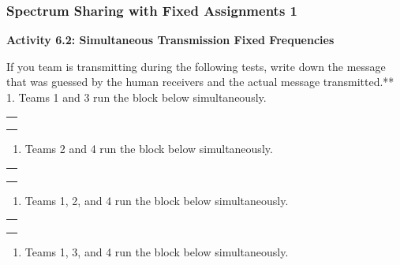 \documentclass[11pt]{article}
\providecommand{\tightlist}{%
      \setlength{\itemsep}{0pt}\setlength{\parskip}{0pt}}
\begin{document}
\hypertarget{spectrum-sharing-with-fixed-assignments-1}{%
\subsubsection*{Spectrum Sharing with Fixed Assignments
1}\label{spectrum-sharing-with-fixed-assignments-1}}

\textbf{Activity 6.2: Simultaneous Transmission Fixed Frequencies}

If you team is transmitting during the following tests, write down the
message that was guessed by the human receivers and the actual message
transmitted.** 1. Teams 1 and 3 run the block below simultaneously.

\begin{longtable}[]{@{}l@{}}
\toprule
 \\
\midrule
\endhead
 \\
 \\
 \\
\bottomrule
\end{longtable}

\begin{enumerate}
\def\labelenumi{\arabic{enumi}.}
\setcounter{enumi}{1}
\tightlist
\item
  Teams 2 and 4 run the block below simultaneously.
\end{enumerate}

\begin{longtable}[]{@{}l@{}}
\toprule
 \\
\midrule
\endhead
 \\
 \\
 \\
\bottomrule
\end{longtable}

\begin{enumerate}
\def\labelenumi{\arabic{enumi}.}
\setcounter{enumi}{2}
\tightlist
\item
  Teams 1, 2, and 4 run the block below simultaneously.
\end{enumerate}

\begin{longtable}[]{@{}l@{}}
\toprule
 \\
\midrule
\endhead
 \\
 \\
 \\
\bottomrule
\end{longtable}

\begin{enumerate}
\def\labelenumi{\arabic{enumi}.}
\setcounter{enumi}{3}
\tightlist
\item
  Teams 1, 3, and 4 run the block below simultaneously.
\end{enumerate}
\end{document}
